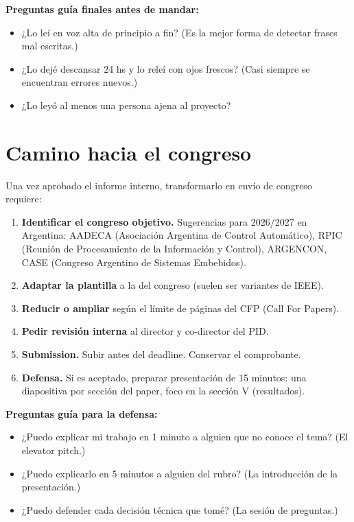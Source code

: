 \documentclass[11pt,a4paper]{article}
\begin{document}
\begin{guia}
\textbf{Preguntas guía finales antes de mandar:}
\begin{itemize}
    \item ¿Lo leí en voz alta de principio a fin? (Es la mejor forma de detectar frases mal escritas.)
    \item ¿Lo dejé descansar 24 hs y lo releí con ojos frescos? (Casi siempre se encuentran errores nuevos.)
    \item ¿Lo leyó al menos una persona ajena al proyecto?
\end{itemize}
\end{guia}

\hrulefill

\section{Camino hacia el congreso}

Una vez aprobado el informe interno, transformarlo en envío de congreso requiere:

\begin{enumerate}
    \item \textbf{Identificar el congreso objetivo.} Sugerencias para 2026/2027 en Argentina: AADECA (Asociación Argentina de Control Automático), RPIC (Reunión de Procesamiento de la Información y Control), ARGENCON, CASE (Congreso Argentino de Sistemas Embebidos).
    \item \textbf{Adaptar la plantilla} a la del congreso (suelen ser variantes de IEEE).
    \item \textbf{Reducir o ampliar} según el límite de páginas del CFP (Call For Papers).
    \item \textbf{Pedir revisión interna} al director y co-director del PID.
    \item \textbf{Submission.} Subir antes del deadline. Conservar el comprobante.
    \item \textbf{Defensa.} Si es aceptado, preparar presentación de 15 minutos: una diapositiva por sección del paper, foco en la sección V (resultados).
\end{enumerate}

\begin{guia}
\textbf{Preguntas guía para la defensa:}
\begin{itemize}
    \item ¿Puedo explicar mi trabajo en 1 minuto a alguien que no conoce el tema? (El elevator pitch.)
    \item ¿Puedo explicarlo en 5 minutos a alguien del rubro? (La introducción de la presentación.)
    \item ¿Puedo defender cada decisión técnica que tomé? (La sesión de preguntas.)
\end{itemize}
\end{guia}
\end{document}
